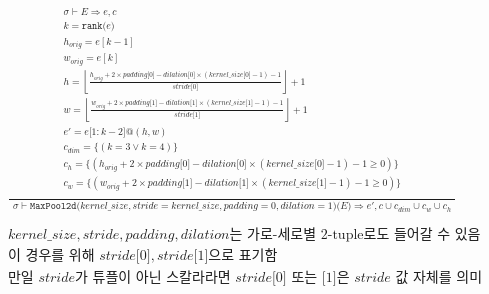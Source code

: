 \documentclass{article}
\makeatletter
\newcommand{\x}{\times}
\newcommand{\Rar}{\Rightarrow}
\newcommand{\mtt}[1]{\mathtt{#1}}
\newcommand{\op}[2]{\mtt{#1(}#2\mtt{)}}
\newcommand{\module}[3]{\mtt{#1(}#2\mtt{)(}#3\mtt{)}}
\newcommand{\conc}{\mtt{@}}
\newcommand{\ind}[1]{\mtt{[}#1\mtt{]}}
\newcommand{\indr}[2]{\mtt{[}#1\mtt{:}#2\mtt{]}}
\makeatother
\begin{document}
\begin{align*}
  \frac
  {
    \begin{array}{l}
      \sigma \vdash E \Rar e, c \\
      k = \op{rank}{e} \\
      h_{orig} = e[k-1] \\
      w_{orig} = e[k] \\
      h = \left\lfloor \frac{h_{orig} + 2 \x padding \ind{0} - dilation \ind{0}
        \x (kernel\_size \ind{0} - 1) - 1}{stride \ind{0}} \right\rfloor + 1 \\
      w = \left\lfloor \frac{w_{orig} + 2 \x padding \ind{1} - dilation \ind{1}
        \x (kernel\_size \ind{1} - 1) - 1}{stride \ind{1}} \right\rfloor + 1 \\
      e' = e\indr{1}{k-2} \conc (h, w) \\
      c_{dim} = \{ (k = 3 \lor k = 4) \} \\
      c_h = \{ (h_{orig} + 2 \x padding \ind{0} - dilation \ind{0}
        \x (kernel\_size \ind{0} - 1) - 1 \geq 0) \} \\
      c_w = \{ (w_{orig} + 2 \x padding \ind{1} - dilation \ind{1}
        \x (kernel\_size \ind{1} - 1) - 1 \geq 0) \} \\
    \end{array}
  }
  {
    \begin{array}{c}
      \sigma \vdash \module{MaxPool2d}{kernel\_size, stride=kernel\_size,
        padding=0, dilation=1}{E}
        \Rar e', c \cup c_{dim} \cup c_w \cup c_h 
    \end{array}
  } \\
  \\
  \text{$kernel\_size, stride, padding, dilation$는 가로-세로별 2-tuple로도 들어갈
  수 있음} \\
  \text{이 경우를 위해 $stride\ind{0}, stride\ind{1}$으로 표기함} \\
  \text{만일 $stride$가 튜플이 아닌 스칼라라면 $stride\ind{0}$ 또는 $\ind{1}$은
    $stride$ 값 자체를 의미}
\end{align*}
\end{document}
